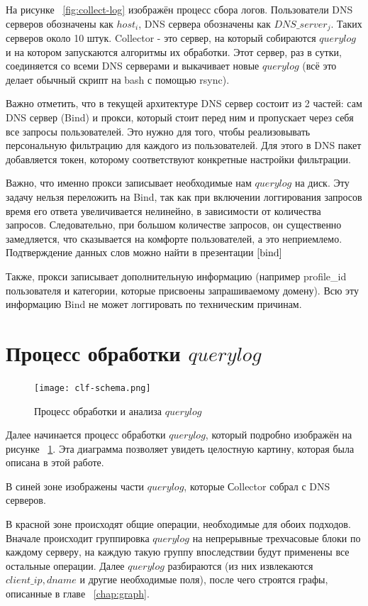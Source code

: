 \documentclass[14pt]{extreport} %
\begin{document}
На рисунке ~\ref{fig:collect-log} изображён процесс сбора логов. Пользователи DNS серверов обозначены как $host_i$, DNS сервера обозначены как $DNS\_server_j$. Таких серверов около 10 штук. Collector - это сервер, на который собираются $querylog$ и на котором запускаются алгоритмы их обработки. Этот сервер, раз в сутки, соединяется со всеми DNS серверами и выкачивает новые $querylog$ (всё это делает обычный скрипт на bash с помощью rsync).

Важно отметить, что в текущей архитектуре DNS сервер состоит из 2 частей: сам DNS сервер (Bind) и прокси, который стоит перед ним и пропускает через себя все запросы пользователей. Это нужно для того, чтобы реализовывать персональную фильтрацию для каждого из пользователей. Для этого в DNS пакет добавляется токен, которому соответствуют конкретные настройки фильтрации. 

Важно, что именно прокси записывает необходимые нам $querylog$ на диск. Эту задачу нельзя переложить на Bind, так как при включении логгирования запросов время его ответа увеличивается нелинейно, в зависимости от количества запросов. Следовательно, при большом количестве запросов, он существенно замедляется, что сказывается на комфорте пользователей, а это неприемлемо. Подтверждение данных слов можно найти в презентации  $\cite{bind}$

Также, прокси записывает дополнительную информацию (например profile\_id пользователя и категории, которые присвоены запрашиваемому домену). Всю эту информацию Bind не может логгировать по техническим причинам.

\section{Процесс обработки $querylog$}
\begin{figure}[H]
	\center
	\texttt{[image: clf-schema.png]}
	\caption{Процесс обработки и анализа $querylog$}
			
	\label{fig:full-proc}
\end{figure}

Далее начинается процесс обработки $querylog$, который подробно изображён на  рисунке ~\ref{fig:full-proc}. Эта диаграмма позволяет увидеть целостную картину, которая была описана в этой работе.


В синей зоне изображены части $querylog$, которые Сollector собрал с DNS серверов.

В красной зоне происходят общие операции, необходимые для обоих подходов. Вначале происходит группировка $querylog$ на непрерывные трехчасовые блоки по каждому серверу, на каждую такую группу впоследствии будут применены все остальные операции. Далее $querylog$ разбираются (из них извлекаются $client\_ip, dname$ и другие необходимые поля), после чего строятся графы, описанные в главе ~\ref{chap:graph}. 
\end{document}
